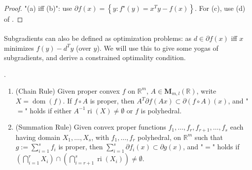 \begin{proof}
	"(a) iff (b)": use $\partial f(x) = \left\{y:f^\star(y)=x^Ty-f(x)\right\}$. For (c), use (d) of .
\end{proof}

\paragraph{}Subgradients can also be defined as optimization problems: as $d\in\partial f(x)$ iff $x$ minimizes $f(y)-d^Ty$ (over $y$). We will use this to give some yogas of subgradients, and derive a constrained optimality condition.

\begin{prop}\label{prop:046-yoga-subgradients}.
	\begin{enumerate}[label=(\alph*)]
		\item (Chain Rule) Given proper convex $f$ on $\mathbb{R}^m$, $A\in \mathbf{M}_{m,l}(\mathbb{R})$, write $X=\operatorname{dom}(f)$. If $f\circ A$ is proper, then $A^T\partial f(Ax)\subset \partial (f\circ A)(x)$, and "$=$" holds if either $A^{-1}\operatorname{ri}(X)\neq\emptyset$ or $f$ is polyhedral.
		\item (Summation Rule) Given convex proper functions $f_1,\dotsc, f_r,f_{r+1},\dotsc,f_{s}$ each having domain $X_1,\dotsc,X_s$, with $f_1,\dotsc,f_r$ polyhedral, on $\mathbb{R}^m$ such that $g:=\sum_{i=1}^sf_i$ is proper, then $\sum_{i=1}^s\partial f_i(x)\subset \partial g(x)$, and "$=$" holds if $\left(\bigcap_{i=1}^r X_i\right)\cap \left(\bigcap_{i=r+1}^s \operatorname{ri}(X_i)\right)\neq\emptyset$.
	\end{enumerate}
\end{prop}

